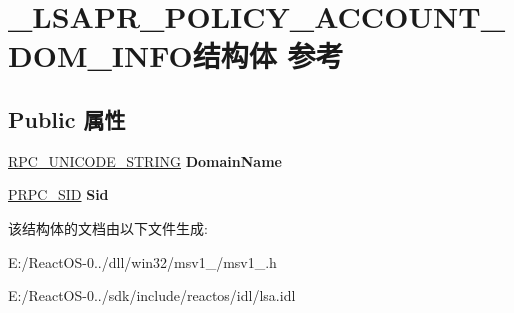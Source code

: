 \hypertarget{struct___l_s_a_p_r___p_o_l_i_c_y___a_c_c_o_u_n_t___d_o_m___i_n_f_o}{}\section{\+\_\+\+L\+S\+A\+P\+R\+\_\+\+P\+O\+L\+I\+C\+Y\+\_\+\+A\+C\+C\+O\+U\+N\+T\+\_\+\+D\+O\+M\+\_\+\+I\+N\+F\+O结构体 参考}
\label{struct___l_s_a_p_r___p_o_l_i_c_y___a_c_c_o_u_n_t___d_o_m___i_n_f_o}
\subsection*{Public 属性}
\begin{DoxyCompactItemize}
\item 
\mbox{\label{struct___l_s_a_p_r___p_o_l_i_c_y___a_c_c_o_u_n_t___d_o_m___i_n_f_o_a48396e3bf01787d7ba1ab21f49e8ed85}} 
\hyperlink{struct___r_p_c___u_n_i_c_o_d_e___s_t_r_i_n_g}{R\+P\+C\+\_\+\+U\+N\+I\+C\+O\+D\+E\+\_\+\+S\+T\+R\+I\+NG} {\bfseries Domain\+Name}
\item 
\mbox{\label{struct___l_s_a_p_r___p_o_l_i_c_y___a_c_c_o_u_n_t___d_o_m___i_n_f_o_ae8d475e0fe1a817eb0905a1812376a66}} 
\hyperlink{struct___r_p_c___s_i_d}{P\+R\+P\+C\+\_\+\+S\+ID} {\bfseries Sid}
\end{DoxyCompactItemize}


该结构体的文档由以下文件生成\+:\begin{DoxyCompactItemize}
\item 
E\+:/\+React\+O\+S-\/0../dll/win32/msv1\+\_/msv1\+\_.\+h\item 
E\+:/\+React\+O\+S-\/0../sdk/include/reactos/idl/lsa.\+idl\end{DoxyCompactItemize}
